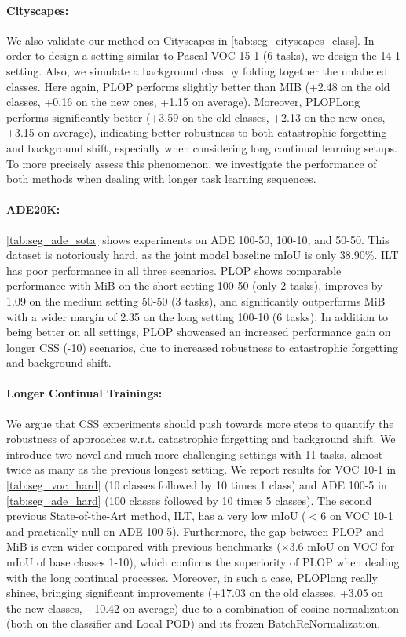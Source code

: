 \paragraph{Cityscapes:} We also validate our method on Cityscapes in
\autoref{tab:seg_cityscapes_class}. In order to design a setting similar to Pascal-VOC 15-1 (6
tasks), we design the 14-1 setting. Also, we simulate a background class by folding together the
unlabeled classes. Here again, PLOP performs slightly better than MIB (+2.48 \pp on the old classes,
+0.16 \pp on the new ones, +1.15 \pp on average). Moreover, PLOPLong performs significantly better
(+3.59 \pp on the old classes, +2.13 \pp on the new ones, +3.15 \pp on average), indicating better
robustness to both catastrophic forgetting and background shift, especially when considering long
continual learning setups. To more precisely assess this phenomenon, we investigate the performance
of both methods when dealing with longer task learning sequences.

\paragraph{ADE20K:} \autoref{tab:seg_ade_sota} shows experiments on ADE 100-50, 100-10, and 50-50.
This dataset is notoriously hard, as the joint model baseline \ac{mIoU} is only 38.90\%. ILT has
poor performance in all three scenarios. PLOP shows comparable performance with MiB on the short
setting 100-50 (only 2 tasks), improves by 1.09 \pp on the medium setting 50-50 (3 tasks), and
significantly outperforms MiB with a wider margin of 2.35 \pp on the long setting 100-10 (6 tasks).
In addition to being better on all settings, PLOP showcased an increased performance gain on longer
\ac{CSS} (-10) scenarios, due to increased robustness to catastrophic forgetting and
background shift.


\paragraph{Longer Continual Trainings:}We argue that \ac{CSS} experiments should push towards more
steps \citep{wortsman2020supermasks,lomonaco2020ar1,castro2018end_to_end_inc_learn} to quantify the
robustness of approaches w.r.t. catastrophic forgetting and background shift. We introduce two novel
and much more challenging settings with 11 tasks, almost twice as many as the previous longest
setting. We report results for VOC 10-1 in \autoref{tab:seg_voc_hard} (10 classes followed by 10
times 1 class) and ADE 100-5 in \autoref{tab:seg_ade_hard} (100 classes followed by 10 times 5
classes). The second previous State-of-the-Art method, ILT, has a very low \ac{mIoU} ($<6$ on VOC
10-1 and practically null on ADE 100-5). Furthermore, the gap between PLOP and MiB is even wider
compared with previous benchmarks (\eg $\times$3.6 \ac{mIoU} on VOC for \ac{mIoU} of base classes
1-10), which confirms the superiority of PLOP when dealing with the long continual processes.
Moreover, in such a case, PLOPlong really shines, bringing significant improvements (+17.03 \pp on
the old classes, +3.05 \pp on the new classes, +10.42 \pp on average) due to a combination of cosine
normalization (both on the classifier and Local POD) and its frozen BatchReNormalization.

